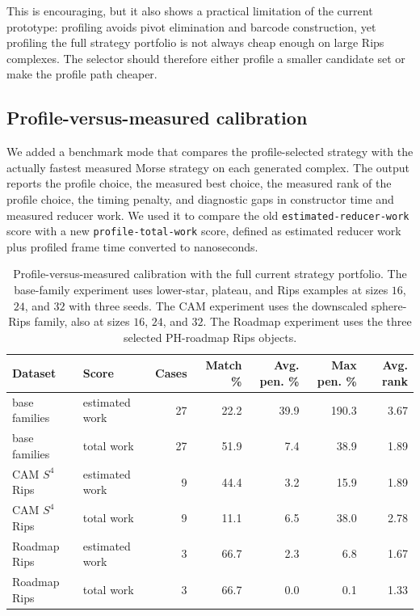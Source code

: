 \documentclass[11pt]{article}
\begin{document}
This is encouraging, but it also shows a practical limitation of the current prototype:
profiling avoids pivot elimination and barcode construction, yet profiling the full
strategy portfolio is not always cheap enough on large Rips complexes.  The selector should
therefore either profile a smaller candidate set or make the profile path cheaper.

\subsection{Profile-versus-measured calibration}
We added a benchmark mode that compares the profile-selected strategy with the actually
fastest measured Morse strategy on each generated complex.  The output reports the profile
choice, the measured best choice, the measured rank of the profile choice, the timing
penalty, and diagnostic gaps in constructor time and measured reducer work.  We used it to
compare the old \texttt{estimated-reducer-work} score with a new
\texttt{profile-total-work} score, defined as estimated reducer work plus profiled frame
time converted to nanoseconds.

\begin{table}[ht]
\centering
\scriptsize
\setlength{\tabcolsep}{3pt}
\begin{tabular}{llrrrrr}
\toprule
Dataset & Score & Cases & Match \% & Avg. pen. \% & Max pen. \% & Avg. rank \\
\midrule
base families & estimated work & 27 & 22.2 & 39.9 & 190.3 & 3.67 \\
base families & total work     & 27 & 51.9 & 7.4  & 38.9  & 1.89 \\
\midrule
CAM $S^4$ Rips & estimated work & 9 & 44.4 & 3.2 & 15.9 & 1.89 \\
CAM $S^4$ Rips & total work     & 9 & 11.1 & 6.5 & 38.0 & 2.78 \\
\midrule
Roadmap Rips & estimated work & 3 & 66.7 & 2.3 & 6.8 & 1.67 \\
Roadmap Rips & total work     & 3 & 66.7 & 0.0 & 0.1 & 1.33 \\
\bottomrule
\end{tabular}
\caption{Profile-versus-measured calibration with the full current strategy portfolio.
The base-family experiment uses lower-star, plateau, and Rips examples at sizes $16$,
$24$, and $32$ with three seeds.  The CAM experiment uses the downscaled sphere-Rips
family, also at sizes $16$, $24$, and $32$.  The Roadmap experiment uses the three selected
PH-roadmap Rips objects.}
\label{tab:profile-calibration-base}
\end{table}
\end{document}
